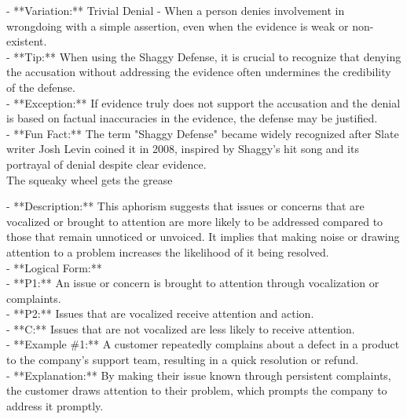 \documentclass[a4paper,12pt,single,pdftex]{scrbook}
\begin{document}
    
      - **Variation:** Trivial Denial - When a person denies involvement in wrongdoing with a simple assertion, even when the evidence is weak or non-existent.
    \\

    
      - **Tip:** When using the Shaggy Defense, it is crucial to recognize that denying the accusation without addressing the evidence often undermines the credibility of the defense.
    \\

    
      - **Exception:** If evidence truly does not support the accusation and the denial is based on factual inaccuracies in the evidence, the defense may be justified.
    \\

    
      - **Fun Fact:** The term "Shaggy Defense" became widely recognized after Slate writer Josh Levin coined it in 2008, inspired by Shaggy's hit song and its portrayal of denial despite clear evidence.
    \\

  

The squeaky wheel gets the grease
    
      - **Description:** This aphorism suggests that issues or concerns that are vocalized or brought to attention are more likely to be addressed compared to those that remain unnoticed or unvoiced. It implies that making noise or drawing attention to a problem increases the likelihood of it being resolved.
    \\

    
      - **Logical Form:**
    \\

    
        - **P1:** An issue or concern is brought to attention through vocalization or complaints.
    \\

    
        - **P2:** Issues that are vocalized receive attention and action.
    \\

    
        - **C:** Issues that are not vocalized are less likely to receive attention.
    \\

    
      - **Example \#1:** A customer repeatedly complains about a defect in a product to the company’s support team, resulting in a quick resolution or refund.
    \\

    
      - **Explanation:** By making their issue known through persistent complaints, the customer draws attention to their problem, which prompts the company to address it promptly.
    \\
\end{document}
